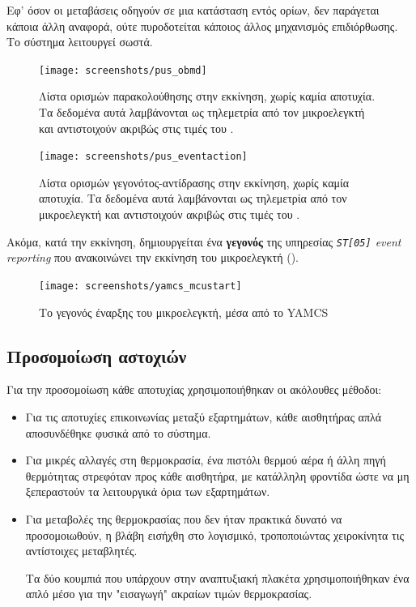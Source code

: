 \documentclass[a4paper,nobib]{tufte-book}
\begin{document}
Εφ' όσον οι μεταβάσεις οδηγούν σε μια κατάσταση εντός ορίων, δεν παράγεται κάποια άλλη αναφορά, ούτε πυροδοτείται κάποιος άλλος μηχανισμός επιδιόρθωσης. Το σύστημα λειτουργεί σωστά.

\begin{figure}[h]
	\texttt{[image: screenshots/pus\_obmd]}
	\caption[Λίστα ορισμών παρακολούθησης στην εκκίνηση, χωρίς καμία αποτυχία]{Λίστα ορισμών παρακολούθησης στην εκκίνηση, χωρίς καμία αποτυχία. Τα δεδομένα αυτά λαμβάνονται ως τηλεμετρία από τον μικροελεγκτή και αντιστοιχούν ακριβώς στις τιμές του .}
	\label{fig:pus_obmd}
\end{figure}

\begin{figure}[h]
	\texttt{[image: screenshots/pus\_eventaction]}
	\caption[Λίστα ορισμών γεγονότος-αντίδρασης]{Λίστα ορισμών γεγονότος-αντίδρασης στην εκκίνηση, χωρίς καμία αποτυχία. Τα δεδομένα αυτά λαμβάνονται ως τηλεμετρία από τον μικροελεγκτή και αντιστοιχούν ακριβώς στις τιμές του .}
	\label{fig:pus_eventaction}
\end{figure}

Ακόμα, κατά την εκκίνηση, δημιουργείται ένα \textbf{γεγονός} της υπηρεσίας \emph{\texttt{ST[05]} event reporting} που ανακοινώνει την εκκίνηση του μικροελεγκτή ().

\begin{figure}[h]
	\centering
	\caption{Το γεγονός έναρξης του μικροελεγκτή, μέσα από το \acs{YAMCS}}
	\label{fig:yamcsmcustart}
	\texttt{[image: screenshots/yamcs\_mcustart]}
\end{figure}

\FloatBarrier
\subsection{Προσομοίωση αστοχιών}
\label{sec:simul}

Για την προσομοίωση κάθε αποτυχίας χρησιμοποιήθηκαν οι ακόλουθες μέθοδοι:
\begin{itemize}
	\item Για τις αποτυχίες επικοινωνίας μεταξύ εξαρτημάτων, κάθε αισθητήρας απλά αποσυνδέθηκε φυσικά από το σύστημα.
	\item Για μικρές αλλαγές στη θερμοκρασία, ένα πιστόλι θερμού αέρα ή άλλη πηγή θερμότητας στρεφόταν προς κάθε αισθητήρα, με κατάλληλη φροντίδα ώστε να μη ξεπεραστούν τα λειτουργικά όρια των εξαρτημάτων.
	\item Για μεταβολές της θερμοκρασίας που δεν ήταν πρακτικά δυνατό να προσομοιωθούν, η βλάβη εισήχθη στο λογισμικό, τροποποιώντας χειροκίνητα τις αντίστοιχες μεταβλητές.
	
	Τα δύο κουμπιά που υπάρχουν στην αναπτυξιακή πλακέτα χρησιμοποιήθηκαν ένα απλό μέσο για την "εισαγωγή" ακραίων τιμών θερμοκρασίας.
\end{itemize}
\end{document}
